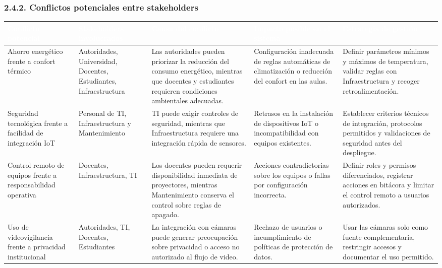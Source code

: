 \subsubsection*{2.4.2. Conflictos potenciales entre stakeholders}


\begingroup
\small
\begin{longtable}{|p{3.1cm}|p{3.1cm}|p{3.1cm}|p{3.1cm}|p{3.1cm}|}
\hline
\cellcolor{sigagreen}\textcolor{white}{\textbf{Conflicto potencial}} & \cellcolor{sigagreen}\textcolor{white}{\textbf{Stakeholders involucrados}} & \cellcolor{sigagreen}\textcolor{white}{\textbf{Causa del conflicto}} & \cellcolor{sigagreen}\textcolor{white}{\textbf{Impacto posible en el sistema}} & \cellcolor{sigagreen}\textcolor{white}{\textbf{Estrategia de gestión}} \\ \hline
Ahorro energético frente a confort térmico & Autoridades, Universidad, Docentes, Estudiantes, Infraestructura & Las autoridades pueden priorizar la reducción del consumo energético, mientras que docentes y estudiantes requieren condiciones ambientales adecuadas. & Configuración inadecuada de reglas automáticas de climatización o reducción del confort en las aulas. & Definir parámetros mínimos y máximos de temperatura, validar reglas con Infraestructura y recoger retroalimentación. \\ \hline
Seguridad tecnológica frente a facilidad de integración IoT & Personal de TI, Infraestructura y Mantenimiento & TI puede exigir controles de seguridad, mientras que Infraestructura requiere una integración rápida de sensores. & Retrasos en la instalación de dispositivos IoT o incompatibilidad con equipos existentes. & Establecer criterios técnicos de integración, protocolos permitidos y validaciones de seguridad antes del despliegue. \\ \hline
Control remoto de equipos frente a responsabilidad operativa & Docentes, Infraestructura, TI & Los docentes pueden requerir disponibilidad inmediata de proyectores, mientras Mantenimiento conserva el control sobre reglas de apagado. & Acciones contradictorias sobre los equipos o fallas por configuración incorrecta. & Definir roles y permisos diferenciados, registrar acciones en bitácora y limitar el control remoto a usuarios autorizados. \\ \hline
Uso de videovigilancia frente a privacidad institucional & Autoridades, TI, Docentes, Estudiantes & La integración con cámaras puede generar preocupación sobre privacidad o acceso no autorizado al flujo de video. & Rechazo de usuarios o incumplimiento de políticas de protección de datos. & Usar las cámaras solo como fuente complementaria, restringir accesos y documentar el uso permitido. \\ \hline

\end{longtable}
